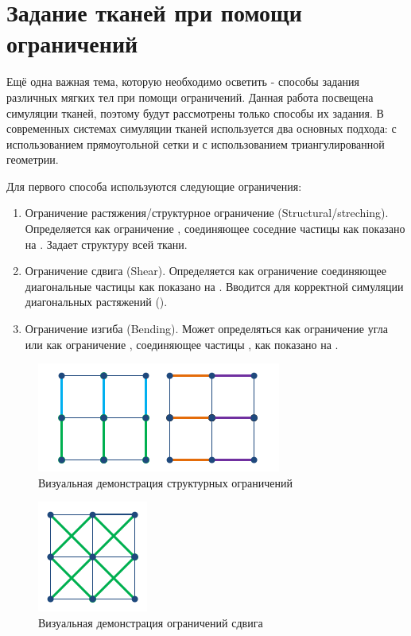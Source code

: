 \section{Задание тканей при помощи ограничений} \label{ch2:connect} %
	Ещё одна важная тема, которую необходимо осветить - способы задания различных мягких тел при помощи ограничений. Данная работа посвещена симуляции тканей, поэтому будут рассмотрены только способы их задания. В современных системах симуляции тканей используется два основных подхода: с использованием прямоугольной сетки и с использованием триангулированной геометрии.
	
	Для первого способа используются следующие ограничения:
	\begin{enumerate}[1.]
		\item Ограничение растяжения/структурное ограничение (Structural/streching). Определяется как ограничение , соединяющее соседние частицы как показано на . Задает структуру всей ткани.
		\item Ограничение сдвига (Shear). Определяется как ограничение  соединяющее диагональные частицы как показано на . Вводится для корректной симуляции диагональных растяжений ().
		\item Ограничение изгиба (Bending). Может определяться как ограничение угла \cite{wang2014angle} или как ограничение , соединяющее частицы , как показано на .
	\end{enumerate}
	
	\begin{figure}[ht!] 
		\center
		\includegraphics [scale=0.5] {my_folder/images//structural}
		\caption{Визуальная демонстрация структурных ограничений}
		\label{fig:structural}  
	\end{figure}
	
	\begin{figure}[ht!] 
		\center
		\includegraphics [scale=0.5] {my_folder/images//shear}
		\caption{Визуальная демонстрация ограничений сдвига}
		\label{fig:shear}  
	\end{figure}
	
